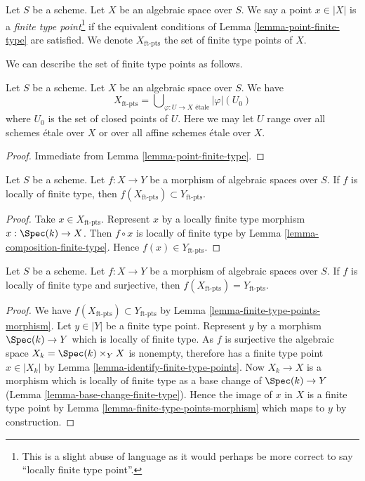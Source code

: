 \begin{definition}
\label{definition-finite-type-point}
Let $S$ be a scheme. Let $X$ be an algebraic space over $S$.
We say a point $x \in |X|$ is a {\it finite type point}\footnote{This is a
slight abuse of language as it would perhaps be more correct to say
``locally finite type point''.} if the equivalent conditions of
Lemma \ref{lemma-point-finite-type}
are satisfied. We denote $X_{\text{ft-pts}}$ the set of finite type points
of $X$.
\end{definition}

\noindent
We can describe the set of finite type points as follows.

\begin{lemma}
\label{lemma-identify-finite-type-points}
Let $S$ be a scheme. Let $X$ be an algebraic space over $S$. We have
$$
X_{\text{ft-pts}} =
\bigcup\nolimits_{\varphi : U \to X\text{ \'etale}} |\varphi|(U_0)
$$
where $U_0$ is the set of closed points of $U$.
Here we may let $U$ range over all schemes \'etale over $X$ or over all
affine schemes \'etale over $X$.
\end{lemma}

\begin{proof}
Immediate from
Lemma \ref{lemma-point-finite-type}.
\end{proof}

\begin{lemma}
\label{lemma-finite-type-points-morphism}
Let $S$ be a scheme.
Let $f : X \to Y$ be a morphism of algebraic spaces over $S$.
If $f$ is locally of finite type, then
$f(X_{\text{ft-pts}}) \subset Y_{\text{ft-pts}}$.
\end{lemma}

\begin{proof}
Take $x \in X_{\text{ft-pts}}$. Represent $x$ by a locally finite type morphism
$x : \Spec(k) \to X$. Then $f \circ x$ is locally of finite type by
Lemma \ref{lemma-composition-finite-type}.
Hence $f(x) \in Y_{\text{ft-pts}}$.
\end{proof}

\begin{lemma}
\label{lemma-finite-type-points-surjective-morphism}
Let $S$ be a scheme.
Let $f : X \to Y$ be a morphism of algebraic spaces over $S$.
If $f$ is locally of finite type and surjective, then
$f(X_{\text{ft-pts}}) = Y_{\text{ft-pts}}$.
\end{lemma}

\begin{proof}
We have $f(X_{\text{ft-pts}}) \subset Y_{\text{ft-pts}}$ by
Lemma \ref{lemma-finite-type-points-morphism}.
Let $y \in |Y|$ be a finite type point. Represent $y$ by a morphism
$\Spec(k) \to Y$ which is locally of finite type.
As $f$ is surjective the algebraic space
$X_k = \Spec(k) \times_Y X$ is nonempty, therefore
has a finite type point $x \in |X_k|$ by
Lemma \ref{lemma-identify-finite-type-points}.
Now $X_k \to X$ is a morphism which is locally of finite type as a base change
of $\Spec(k) \to Y$
(Lemma \ref{lemma-base-change-finite-type}).
Hence the image of $x$ in $X$ is a finite type point by
Lemma \ref{lemma-finite-type-points-morphism}
which maps to $y$ by construction.
\end{proof}

